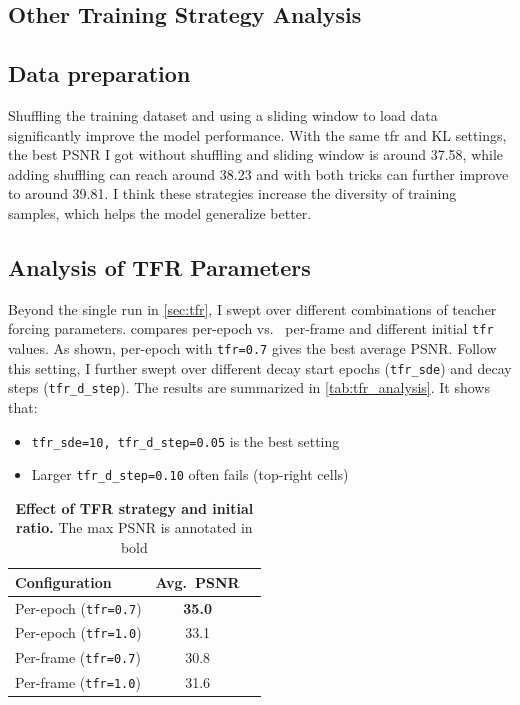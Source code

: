 \documentclass[10pt,twocolumn,letterpaper]{article}
\begin{document}
\subsection{Other Training Strategy Analysis}

\subsection*{Data preparation}

Shuffling the training dataset and using a sliding window to load data
significantly improve the model performance. With the same tfr and KL settings,
the best PSNR I got without shuffling and sliding window is around 37.58, while
adding shuffling can reach around 38.23 and with both tricks can further improve
to around 39.81. I think these strategies increase the diversity of training
samples, which helps the model generalize better.

\subsection*{Analysis of TFR Parameters}

Beyond the single run in \cref{sec:tfr}, I swept over different combinations
of teacher forcing parameters.  compares per-epoch vs.
\ per-frame and different initial \verb|tfr| values. As shown, per-epoch
with \verb|tfr=0.7| gives the best average PSNR. Follow this setting, I
further swept over different decay start epochs (\verb|tfr_sde|) and decay
steps (\verb|tfr_d_step|). The results are summarized in
\cref{tab:tfr_analysis}. It shows that:

\begin{itemize}[itemsep=1pt]
  \item \verb|tfr_sde=10, tfr_d_step=0.05| is the best setting
  \item Larger \verb|tfr_d_step=0.10| often fails (top-right cells)
\end{itemize}

\begin{table}[H]
  \centering
  \begin{tabular}{lcc}
    \toprule
    Configuration & Avg.\ PSNR \\
    \midrule
    Per-epoch (\texttt{tfr=0.7}) & \textbf{35.0} \\
    Per-epoch (\texttt{tfr=1.0}) & 33.1 \\
    Per-frame (\texttt{tfr=0.7}) & 30.8 \\
    Per-frame (\texttt{tfr=1.0}) & 31.6 \\
    \bottomrule
  \end{tabular}
  \caption{\textbf{Effect of TFR strategy and initial ratio.} The max PSNR
    is annotated in bold}
  \label{tab:tfr_strategy}
\end{table}
\end{document}
